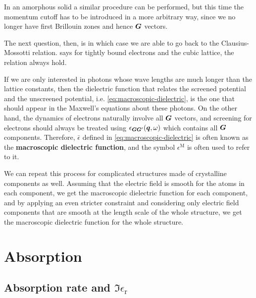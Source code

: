 \documentclass[hyperref, a4paper, 12pt]{report}
\newcommand*{\concept}[1]{{\textbf{#1}}}
\begin{document}
In an amorphous solid a similar procedure can be performed, 
but this time the momentum cutoff has to be introduced 
in a more arbitrary way,
since we no longer have first Brillouin zones 
and hence $\vb*{G}$ vectors. 

The next question, then, is in which case we are able to 
go back to the Clausius-Mossotti relation.
\cite{wider63} says for tightly bound electrons 
and the cubic lattice, 
the relation always hold.

If we are only interested in photons whose wave lengths are much longer than the lattice constants, 
then the dielectric function that relates the screened potential and the unscreened potential, 
i.e. \eqref{eq:macroscopic-dielectric},
is the one that should appear in the Maxwell's equations about these photons.
On the other hand, the dynamics of electrons naturally involve all $\vb*{G}$ vectors,
and screening for electrons should always be treated using $\epsilon_{\vb*{G} \vb*{G}'} (\vb*{q}, \omega)$
which contains all $\vb*{G}$ components. 
Therefore, $\bar{\epsilon}$ defined in \eqref{eq:macroscopic-dielectric} 
is often known as the \concept{macroscopic dielectric function}, 
and the symbol $\epsilon^{\text{M}}$ is often used to refer to it.

We can repeat this process for complicated structures made of crystalline components as well.
Assuming that the electric field is smooth for the atoms in each component,
we get the macroscopic dielectric function for each component,
and by applying an even stricter constraint and
considering only electric field components that are smooth at the length scale of the whole structure,
we get the macroscopic dielectric function for the whole structure.

\section{Absorption}

\subsection{Absorption rate and $\Im \epsilon_{\text{r}}$}
\end{document}
